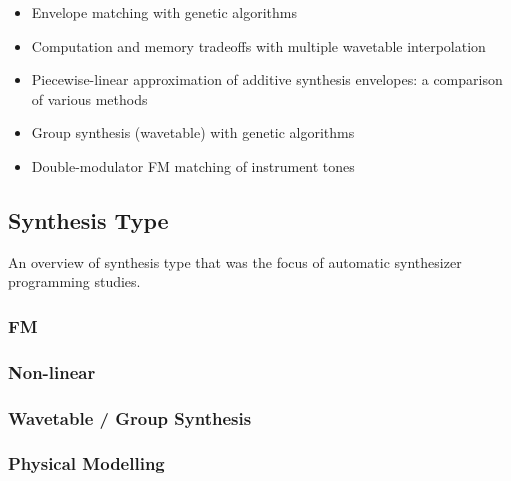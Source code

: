 \begin{itemize}
	\item \cite{horner1995envelope} Envelope matching with genetic algorithms
	\item \cite{horner1996computation} Computation and memory tradeoffs with multiple wavetable interpolation
	\item \cite{horner1996piecewise} Piecewise-linear approximation of additive synthesis envelopes: a comparison of various methods
	\item \cite{cheung1996group} Group synthesis (wavetable) with genetic algorithms
	\item \cite{horner1996double} Double-modulator FM matching of instrument tones
\end{itemize}


\subsection{Synthesis Type}
An overview of synthesis type that was the focus of automatic synthesizer programming studies.

\subsubsection{FM}
\cite{justice1979analytic}\cite{beauchamp1982synthesis}\cite{payne1987microcomputer}\cite{horner1993machine}\cite{horner1996double}\cite{tan1996automated}\cite{delprat1997global}\cite{lim1999performance}\cite{tan2003automated}
\cite{mitchell2005frequency}\cite{mitchell2007evolutionary}\cite{clement2011automatic}\cite{roth2011comparison}\cite{macret2012automatic}\cite{hamadicharef2012intelligent}\cite{barkan2019deep}

\subsubsection{Non-linear}
\cite{beauchamp1982synthesis}\cite{delprat1990parameter}

\subsubsection{Wavetable / Group Synthesis}
\cite{horner1993methods}\cite{horner1995wavetable}\cite{horner1995envelope}\cite{horner1996computation}\cite{horner1996piecewise}\cite{cheung1996group}\cite{oates1997analytical}\cite{horner1998modeling}\cite{lee1999modeling}\cite{so2002wavetable}

\subsubsection{Physical Modelling}
\cite{vuori1993parameter}\cite{erkut2000extraction}\cite{liang2000recurrent}\cite{nackaerts2001parameter}\cite{riionheimo2003parameter}

